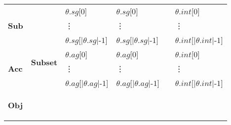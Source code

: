 \documentclass[11pt]{report}
\begin{document}
\begin{table}[tbhp]
\begin{center}
\begin{tabular}[t]{|l|l|l|l|l|l|}
              \multirow{3}{*}{
                \begin{sideways}
                  \textbf{Sub}
                \end{sideways}
              } &
              \multirow{9}{*}{
                \begin{sideways}
                  \textbf{Subset}
                \end{sideways}
              } &
              $\theta$.$sg$[$0$] &
              $\theta$.$sg$[$0$] &
              &
              $\theta$.$int$[$0$] \\
              &
              &
              \hspace{1em}\vdots &
              \hspace{1em}\vdots &
              &
              \hspace{1em}\vdots \\
              &
              &
              $\theta$.$sg$[$|\theta$.$sg|$-$1$] &
              $\theta$.$sg$[$|\theta$.$sg|$-$1$] &
              &
              $\theta$.$int$[$|\theta$.$int|$-$1$] \\
              \cline{1-1}\cline{3-6}
              \multirow{3}{*}{
                \begin{sideways}
                  \textbf{Acc}
                \end{sideways}
              } &
              &
              $\theta$.$ag$[$0$] &
              $\theta$.$ag$[$0$] &
              &
              $\theta$.$int$[$0$] \\
              &
              &
              \hspace{1em}\vdots &
              \hspace{1em}\vdots &
              &
              \hspace{1em}\vdots \\
              &
              &
              $\theta$.$ag$[$|\theta$.$ag|$-$1$] &
              $\theta$.$ag$[$|\theta$.$ag|$-$1$] &
              &
              $\theta$.$int$[$|\theta$.$int|$-$1$] \\
              \cline{1-1}\cline{3-6}
              \multirow{3}{*}{
                \begin{sideways}
                  \textbf{Obj}
                \end{sideways}
}
\end{tabular}
\end{center}
\end{table}
\end{document}

